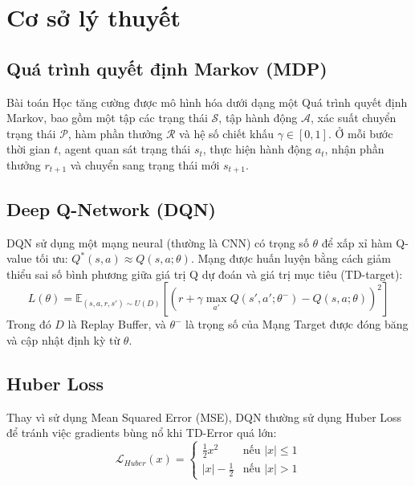 \section{Cơ sở lý thuyết}

\subsection{Quá trình quyết định Markov (MDP)}
Bài toán Học tăng cường được mô hình hóa dưới dạng một Quá trình quyết định Markov, bao gồm một tập các trạng thái $\mathcal{S}$, tập hành động $\mathcal{A}$, xác suất chuyển trạng thái $\mathcal{P}$, hàm phần thưởng $\mathcal{R}$ và hệ số chiết khấu $\gamma \in [0, 1]$. Ở mỗi bước thời gian $t$, agent quan sát trạng thái $s_t$, thực hiện hành động $a_t$, nhận phần thưởng $r_{t+1}$ và chuyển sang trạng thái mới $s_{t+1}$.

\subsection{Deep Q-Network (DQN)}
DQN sử dụng một mạng neural (thường là CNN) có trọng số $\theta$ để xấp xỉ hàm Q-value tối ưu: $Q^*(s, a) \approx Q(s, a; \theta)$. Mạng được huấn luyện bằng cách giảm thiểu sai số bình phương giữa giá trị Q dự đoán và giá trị mục tiêu (TD-target):
\begin{equation}
    L(\theta) = \mathbb{E}_{(s, a, r, s') \sim U(D)} \left[ \left( r + \gamma \max_{a'} Q(s', a'; \theta^-) - Q(s, a; \theta) \right)^2 \right]
\end{equation}
Trong đó $D$ là Replay Buffer, và $\theta^-$ là trọng số của Mạng Target được đóng băng và cập nhật định kỳ từ $\theta$.

\subsection{Huber Loss}
Thay vì sử dụng Mean Squared Error (MSE), DQN thường sử dụng Huber Loss để tránh việc gradients bùng nổ khi TD-Error quá lớn:
\begin{equation}
    \mathcal{L}_{Huber}(x) = 
    \begin{cases} 
      \frac{1}{2}x^2 & \text{nếu } |x| \leq 1 \\
      |x| - \frac{1}{2} & \text{nếu } |x| > 1
    \end{cases}
\end{equation}
